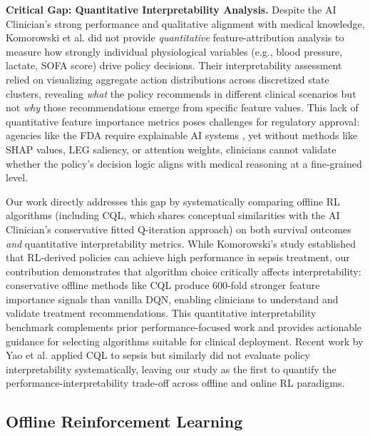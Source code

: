 \textbf{Critical Gap: Quantitative Interpretability Analysis.} Despite the AI Clinician's strong performance and qualitative alignment with medical knowledge, Komorowski et al. did not provide \textit{quantitative} feature-attribution analysis to measure how strongly individual physiological variables (e.g., blood pressure, lactate, SOFA score) drive policy decisions. Their interpretability assessment relied on visualizing aggregate action distributions across discretized state clusters, revealing \textit{what} the policy recommends in different clinical scenarios but not \textit{why} those recommendations emerge from specific feature values. This lack of quantitative feature importance metrics poses challenges for regulatory approval: agencies like the FDA require explainable AI systems \citep{fda2021ai}, yet without methods like SHAP values, LEG saliency, or attention weights, clinicians cannot validate whether the policy's decision logic aligns with medical reasoning at a fine-grained level.

Our work directly addresses this gap by systematically comparing offline RL algorithms (including CQL, which shares conceptual similarities with the AI Clinician's conservative fitted Q-iteration approach) on both survival outcomes \textit{and} quantitative interpretability metrics. While Komorowski's study established that RL-derived policies can achieve high performance in sepsis treatment, our contribution demonstrates that algorithm choice critically affects interpretability: conservative offline methods like CQL produce 600-fold stronger feature importance signals than vanilla DQN, enabling clinicians to understand and validate treatment recommendations. This quantitative interpretability benchmark complements prior performance-focused work and provides actionable guidance for selecting algorithms suitable for clinical deployment. Recent work by Yao et al. \citeyearpar{yao2021sepsis_cql} applied CQL to sepsis but similarly did not evaluate policy interpretability systematically, leaving our study as the first to quantify the performance-interpretability trade-off across offline and online RL paradigms.


\subsection{Offline Reinforcement Learning}\label{sec:related:offline}

